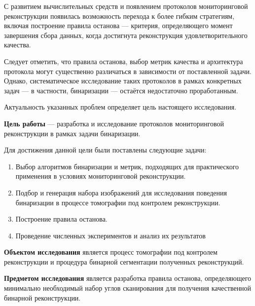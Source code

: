 С развитием вычислительных средств и появлением протоколов мониторинговой реконструкции появилась возможность перехода к более гибким стратегиям, включая построение правила останова — критерия, определяющего момент завершения сбора данных, когда достигнута реконструкция удовлетворительного качества.

Следует отметить, что правила останова, выбор метрик качества и архитектура протокола могут существенно различаться в зависимости от поставленной задачи. Однако, систематическое исследование таких протоколов в рамках конкретных задач — в частности, бинаризации — остаётся недостаточно проработанным.

Актуальность указанных проблем определяет цель настоящего исследования. 

\textbf{Цель работы} — разработка и исследование протоколов мониторинговой реконструкции в рамках задачи бинаризации.

Для достижения данной цели были поставлены следующие задачи:

\begin{enumerate}
    \item Выбор алгоритмов бинаризации и метрик, подходящих для практического применения в условиях мониторинговой реконструкции.
    \item Подбор и генерация набора изображений для исследования поведения бинаризации в процессе томографии под контролем реконструкции.
    \item Построение правила останова.
    \item Проведение численных экспериментов и анализ их результатов
\end{enumerate}

\textbf{Объектом исследования} является процесс томографии под контролем реконструкции и процедура бинарной сегментации полученных реконструкций.

\textbf{Предметом исследования} является разработка правила останова, определяющего минимально необходимый набор углов сканирования для получения качественной бинарной реконструкции.
